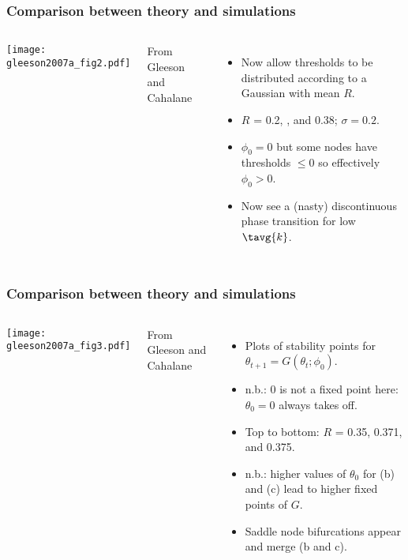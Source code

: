 \begin{frame}
  \frametitle{Comparison between theory and simulations}

  \begin{columns}
    \texttt{[image: gleeson2007a\_fig2.pdf]}

    {\small From Gleeson and Cahalane\cite{gleeson2007a}}
    \begin{itemize}
    \item<1-> 
      Now allow thresholds to be distributed
      according to a Gaussian with mean $R$.
    \item<1-> 
      $R$ = \alert{0.2}, , and 0.38; $\sigma = 0.2$.
    \item<2->
      $\phi_0 = 0$ but some nodes have thresholds $\le 0$
      so effectively $\phi_0 > 0$.
    \item<3->
      Now see a (nasty) discontinuous phase transition
      for low $\tavg{k}$.
    \end{itemize}
  \end{columns}
\end{frame}

\begin{frame}
  \frametitle{Comparison between theory and simulations}

  \begin{columns}
    \texttt{[image: gleeson2007a\_fig3.pdf]}

    {\small From Gleeson and Cahalane\cite{gleeson2007a}}
    \begin{itemize}
    \item<1-> 
      Plots of stability points for $\theta_{t+1} = G(\theta_t; \phi_0)$.
    \item<1-> 
      n.b.: 0 is not a fixed point here: $\theta_0 = 0$ always takes off.
    \item<1-> 
      Top to bottom: $R$ = 0.35, 0.371, and 0.375.
    \item<2-> 
      n.b.: higher values of $\theta_0$ for (b) and (c)
      lead to higher fixed points of $G$.
    \item<3-> 
      Saddle node bifurcations 
      appear and merge (b and c).
    \end{itemize}
  \end{columns}

\end{frame}

